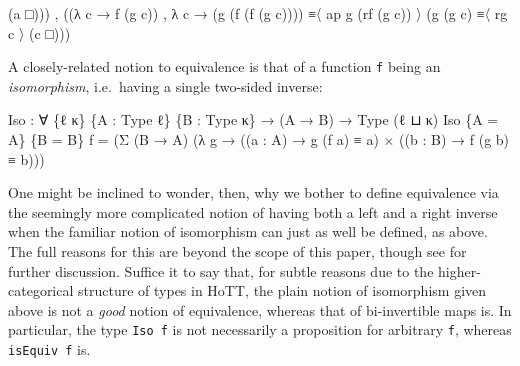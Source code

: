 \documentclass[
  11pt,
  oneside,
  article]{memoir}
\newenvironment{Shaded}{}{}
\newcommand{\NormalTok}[1]{#1}
\newcommand{\OtherTok}[1]{\textcolor[rgb]{0.00,0.44,0.13}{#1}}
\theoremstyle{definition}
\theoremstyle{plain}
\newcommand{\0}{\textsf{0}}
\newcommand{\1}{\tn{\textsf{1}}}
\begin{document}
\begin{Shaded}
\begin{Highlighting}[]
              \OtherTok{(}\NormalTok{a                    □}\OtherTok{)))} 
\NormalTok{    , }\OtherTok{((λ}\NormalTok{ c }\OtherTok{→}\NormalTok{ f\textquotesingle{}\textquotesingle{} }\OtherTok{(}\NormalTok{g\textquotesingle{}\textquotesingle{} c}\OtherTok{))} 
\NormalTok{      , }\OtherTok{λ}\NormalTok{ c }\OtherTok{→} \OtherTok{(}\NormalTok{g }\OtherTok{(}\NormalTok{f }\OtherTok{(}\NormalTok{f\textquotesingle{}\textquotesingle{} }\OtherTok{(}\NormalTok{g\textquotesingle{}\textquotesingle{} c}\OtherTok{))))}\NormalTok{ ≡〈 ap g  }\OtherTok{(}\NormalTok{rf }\OtherTok{(}\NormalTok{g\textquotesingle{}\textquotesingle{} c}\OtherTok{))}\NormalTok{ 〉 }
              \OtherTok{(}\NormalTok{g }\OtherTok{(}\NormalTok{g\textquotesingle{}\textquotesingle{} c}\OtherTok{)}\NormalTok{            ≡〈 rg c 〉}
              \OtherTok{(}\NormalTok{c                    □}\OtherTok{)))}
\end{Highlighting}
\end{Shaded}

A closely-related notion to equivalence is that of a function \texttt{f}
being an \emph{isomorphism}, i.e.~having a single two-sided inverse:

\begin{Shaded}
\begin{Highlighting}[]
\NormalTok{Iso }\OtherTok{:} \OtherTok{∀} \OtherTok{\{}\NormalTok{ℓ κ}\OtherTok{\}} \OtherTok{\{}\NormalTok{A }\OtherTok{:}\NormalTok{ Type ℓ}\OtherTok{\}} \OtherTok{\{}\NormalTok{B }\OtherTok{:}\NormalTok{ Type κ}\OtherTok{\}} \OtherTok{→} \OtherTok{(}\NormalTok{A }\OtherTok{→}\NormalTok{ B}\OtherTok{)} \OtherTok{→}\NormalTok{ Type }\OtherTok{(}\NormalTok{ℓ ⊔ κ}\OtherTok{)}
\NormalTok{Iso }\OtherTok{\{}\NormalTok{A }\OtherTok{=}\NormalTok{ A}\OtherTok{\}} \OtherTok{\{}\NormalTok{B }\OtherTok{=}\NormalTok{ B}\OtherTok{\}}\NormalTok{ f }\OtherTok{=} 
    \OtherTok{(}\NormalTok{Σ }\OtherTok{(}\NormalTok{B }\OtherTok{→}\NormalTok{ A}\OtherTok{)} \OtherTok{(λ}\NormalTok{ g }\OtherTok{→} \OtherTok{((}\NormalTok{a }\OtherTok{:}\NormalTok{ A}\OtherTok{)} \OtherTok{→}\NormalTok{ g }\OtherTok{(}\NormalTok{f a}\OtherTok{)}\NormalTok{ ≡ a}\OtherTok{)} 
\NormalTok{                    × }\OtherTok{((}\NormalTok{b }\OtherTok{:}\NormalTok{ B}\OtherTok{)} \OtherTok{→}\NormalTok{ f }\OtherTok{(}\NormalTok{g b}\OtherTok{)}\NormalTok{ ≡ b}\OtherTok{)))}
\end{Highlighting}
\end{Shaded}

One might be inclined to wonder, then, why we bother to define
equivalence via the seemingly more complicated notion of having both a
left and a right inverse when the familiar notion of isomorphism can
just as well be defined, as above. The full reasons for this are beyond
the scope of this paper, though see \cite{Voevodsky:2013a} for further
discussion. Suffice it to say that, for subtle reasons due to the
higher-categorical structure of types in HoTT, the plain notion of
isomorphism given above is not a \emph{good} notion of equivalence,
whereas that of bi-invertible maps is. In particular, the type
\texttt{Iso\ f} is not necessarily a proposition for arbitrary
\texttt{f}, whereas \texttt{isEquiv\ f} is.
\end{document}
